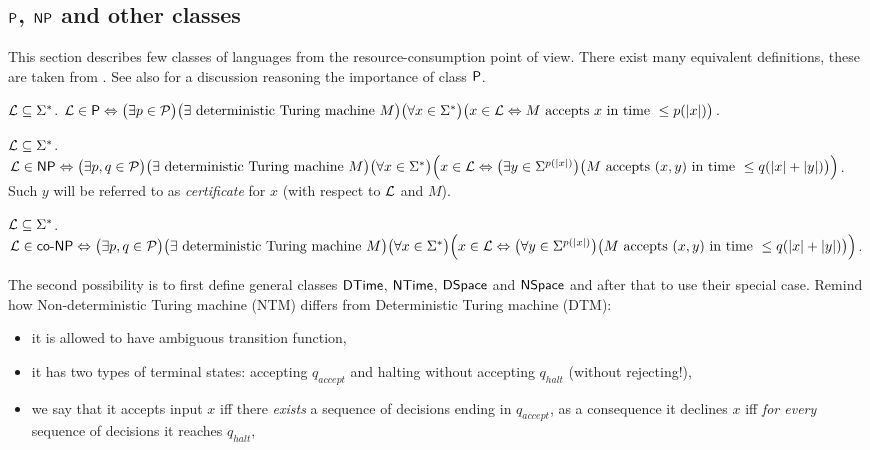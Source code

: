 	
	\subsection{$\P$, $\NP$ and other classes}
	\label{sec:PNP}
		
		This section describes few classes of languages from the resource-consumption point of view. There exist many equivalent definitions, these are taken from \cite{book_comp}. See also \cite[Chapter 1.5.1]{book_comp} for a discussion reasoning the importance of class $\P$.
		
		\begin{defn}\label{def:P}
			${\cal L} \subseteq \Sigma^*$. ${\cal L} \in \P \iff \bigl(\exists p \in {\cal P}\bigr) \bigl(\exists \textnormal{ deterministic Turing machine } M\bigr)\\ \bigl(\forall x \in \Sigma^*\bigr) \bigl(x \in {\cal L} \iff M \textnormal{ accepts } x \textnormal{ in time } \leq p(|x|)\bigr)$.
		\end{defn}
		
		\begin{defn}\label{def:NP}
			${\cal L} \subseteq \Sigma^*$. ${\cal L} \in \NP \iff \bigl(\exists p, q \in {\cal P}\bigr) \bigl(\exists \textnormal{ deterministic Turing machine } M\bigr)\\ \bigl(\forall x \in \Sigma^*\bigr) \Bigl(x \in {\cal L} \iff \bigl(\exists y \in \Sigma^{p(|x|)}\bigr) \bigl(M \textnormal{ accepts } (x,y) \textnormal{ in time } \leq q(|x|+|y|)\bigr)\Bigr)$.\\
			Such $y$ will be referred to as {\em certificate} for $x$ (with respect to $\cal L$ and $M$).
		\end{defn}
		
		\begin{defn}\label{def:coNP}
			${\cal L} \subseteq \Sigma^*$. ${\cal L} \in \coNP \iff \bigl(\exists p, q \in {\cal P}\bigr) \bigl(\exists \textnormal{ deterministic Turing machine } M\bigr)\\ \bigl(\forall x \in \Sigma^*\bigr) \Bigl(x \in {\cal L} \iff \bigl(\forall y \in \Sigma^{p(|x|)}\bigr) \bigl(M \textnormal{ accepts } (x,y) \textnormal{ in time } \leq q(|x|+|y|)\bigr)\Bigr)$.
		\end{defn}
		
		The second possibility is to first define general classes $\DTime$, $\NTime$, $\DSpace$ and $\NSpace$ and after that to use their special case. Remind how Non-deterministic Turing machine (NTM) differs from Deterministic Turing machine (DTM):
		\begin{itemize}
			\item it is allowed to have ambiguous transition function,
			\item it has two types of terminal states: accepting $q_{accept}$ and halting without accepting $q_{halt}$ (without rejecting!),
			\item we say that it accepts input $x$ iff there {\em exists} a sequence of decisions ending in $q_{accept}$, as a consequence it declines $x$ iff {\em for every} sequence of decisions it reaches $q_{halt}$,
		\end{itemize}
		
